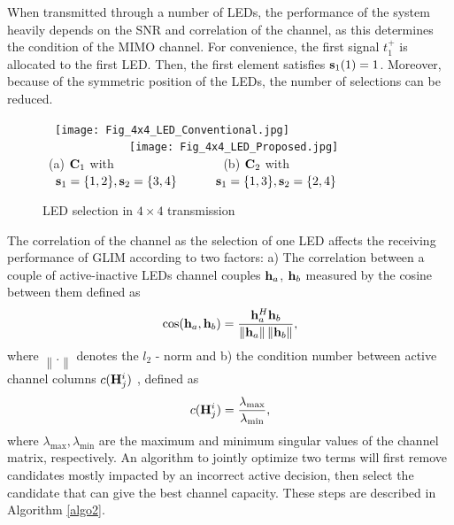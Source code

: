 \documentclass[12pt,letterpaper]{IEEEtran}
\begin{document}
When transmitted through a number of LEDs, the performance of the system heavily depends on the SNR and correlation of the channel, as this determines the condition of the MIMO channel. For convenience, the first signal $t_1^ + $ is allocated to the first LED. Then, the first element satisfies ${{\bf{s}}_1}(1) = 1$. Moreover, because of the symmetric position of the LEDs, the number of selections can be reduced.
\begin{figure}[h] 
	\centering
	~~\texttt{[image: Fig\_4x4\_LED\_Conventional.jpg]}
	~~~~~~~~~~~~~~\texttt{[image: Fig\_4x4\_LED\_Proposed.jpg]}\\ ~(a) ${{\bf{C}}_1}$ with~~~~~~~~~~~~~~~~~ (b) ${{\bf{C}}_2}$ with\\~~${\bold s}_1 =\{1, 2\}, {\bold s}_2 =\{3, 4\}$~~~~~~${\bold s}_1 =\{1, 3\}, {\bold s}_2 =\{2, 4\}$
	\caption{LED selection in $4 \times 4$ transmission}
	\label{Fig:LED_4x4}
\end{figure}
The correlation of the channel as the selection of one LED affects the receiving performance of GLIM according to two factors:
a) The correlation between a couple of active-inactive LEDs channel couples ${{\bf{h}}_a}$, ${{\bf{h}}_b}$ measured by the cosine between them \cite{jiang_angles_1996} defined as
\begin{equation}
\textrm{cos}({{\bf{h}}_a},{{\bf{h}}_b}) = \frac{{{\bf{h}}_a^H{{\bf{h}}_b}}}{{\left\| {{{\bf{h}}_a}} \right\|\left\| {{{\bf{h}}_b}} \right\|}},
\end{equation}
where ${\left\| . \right\|}$ denotes the $l_2{\text{ - norm}}$ and 
b) the condition number between active channel columns $c({{\bf{H}}^i_j})$ \cite{tse_fundamentals_2005}, defined as
\begin{equation}
c({{\bf{H}}^i_j}) = \frac{{{\lambda _{\max }}}}{{{\lambda _{\min }}}},
\end{equation}
where ${\lambda _{\max }},{\lambda _{\min }}$ are the maximum and minimum singular values of the channel matrix, respectively. An algorithm to jointly optimize two terms will first remove candidates mostly impacted by an incorrect active decision, then select the candidate that can give the best channel capacity. These steps are described in Algorithm \ref{algo2}.
\end{document}
